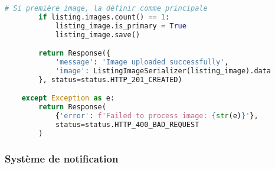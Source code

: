 \begin{lstlisting}[language=Python, caption=listings/views.py - Upload images]
        # Si première image, la définir comme principale
        if listing.images.count() == 1:
            listing_image.is_primary = True
            listing_image.save()

        return Response({
            'message': 'Image uploaded successfully',
            'image': ListingImageSerializer(listing_image).data
        }, status=status.HTTP_201_CREATED)

    except Exception as e:
        return Response(
            {'error': f'Failed to process image: {str(e)}'},
            status=status.HTTP_400_BAD_REQUEST
        )
\end{lstlisting}

\subsubsection{Système de notification}

